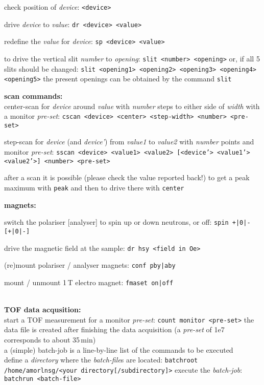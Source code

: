 \documentclass[10pt]{article}
\newcommand{\sclc}[1]{\newline\texttt{\color{blue}\phantom{xxx}#1}\newline }
\newcommand{\<}{$<$}
\renewcommand{\>}{\/$>$}
\begin{document}
check {\color{red}position} of \textsl{device}: 
 \sclc{<device>} 

{\color{red}drive} \textsl{device} to \textsl{value}: 
 \sclc{dr <device> <value>} 
 
{\color{red}redefine} the \textsl{value} for \textsl{device}: 
 \sclc{sp <device> <value>} 

to drive the vertical {\color{red}slit} \textsl{number} to \textsl{opening}: 
 \sclc{slit <number> <opening>} 
or, if all 5 slits should be changed: 
 \sclc{slit <opening1> <opening2> <opening3> <opening4> <opening5>} 
the present openings can be obtained by the command 
 \sclc{slit}  

\vfill
\textbf{scan commands:}\\[1mm]
{\color{red}center-scan} for \textsl{device} around \textsl{value} with \textsl{number}
steps to either side of \textsl{width} with a monitor \textsl{pre-set}: 
 \sclc{cscan <device> <center> <step-width> <number> <pre-set>} 

{\color{red}step-scan} for \textsl{device} (and \textsl{device'}) from \textsl{value1} to \textsl{value2}
with \textsl{number} points and monitor \textsl{pre-set}: 
 \sclc{sscan <device> <value1> <value2> [<device'> <value1'> <value2'>] <number> <pre-set>}

after a scan it is possible (please check the value reported back!)
to get a peak maximum with
 \sclc{peak} 
and then to drive there with 
 \sclc{center} 

\vfill
\textbf{magnets:}\\[1mm]
\parbox[t]{110mm}{
switch the {\color{red}polariser} [{\color{red}analyser}] to spin up
or down neutrons, or off:
 \sclc{spin +|0|- [+|0|-]}
    
drive the {\color{red}magnetic field} at the sample:
 \sclc{dr hsy <field in Oe>}
}   
\parbox[t]{65mm}{%
(re)mount polariser / analyser magnets:
 \sclc{conf pby|aby}
   
mount / unmount 1\,T electro magnet:
 \sclc{fmaset on|off}
}  \\ 


\vfill
\textbf{TOF data acqusition:}\\[1mm]
start a TOF {\color{red}measurement} for a monitor \textsl{pre-set}:
 \sclc{count monitor <pre-set>}  
the data file is created after finishing the data acquisition 
(a \textsl{pre-set} of 1e7 corresponds to about 35\,min) \\

a (simple) batch-job is a line-by-line list of the commands to be executed \\
define a \textsl{directory} where the \textsl{batch-file}s are located:
 \sclc{batchroot /home/amorlnsg/<your directory[/subdirectory]>}
execute the \textsl{batch-job}:
 \sclc{batchrun <batch-file>}
\\[-6ex]
\end{document}
